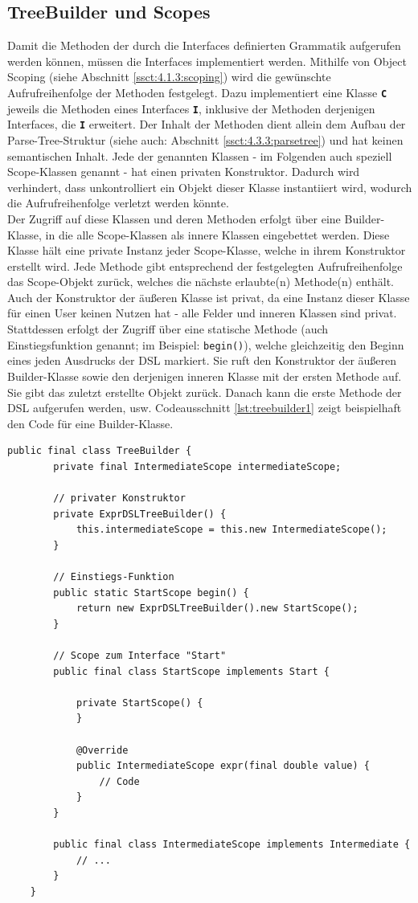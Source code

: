 \subsection{TreeBuilder und Scopes}\label{ssct:4.3.2:treebuilder}
Damit die Methoden der durch die Interfaces definierten Grammatik aufgerufen werden können, müssen die Interfaces implementiert werden. Mithilfe von Object Scoping (siehe Abschnitt \ref{ssct:4.1.3:scoping}) wird die gewünschte Aufrufreihenfolge der Methoden festgelegt. Dazu implementiert eine Klasse \textbf{\texttt{C}} jeweils die Methoden eines Interfaces \textbf{\texttt{I}}, inklusive der Methoden derjenigen Interfaces, die \textbf{\texttt{I}} erweitert. Der Inhalt der Methoden dient allein dem Aufbau der Parse-Tree-Struktur (siehe auch: Abschnitt \ref{ssct:4.3.3:parsetree}) und hat keinen semantischen Inhalt. Jede der genannten Klassen - im Folgenden auch speziell Scope-Klassen genannt - hat einen privaten Konstruktor. Dadurch wird verhindert, dass unkontrolliert ein Objekt dieser Klasse instantiiert wird, wodurch die Aufrufreihenfolge verletzt werden könnte.\\
Der Zugriff auf diese Klassen und deren Methoden erfolgt über eine Builder-Klasse, in die alle Scope-Klassen als innere Klassen eingebettet werden. Diese Klasse hält eine private Instanz jeder Scope-Klasse, welche in ihrem Konstruktor erstellt wird. Jede Methode gibt entsprechend der festgelegten Aufrufreihenfolge das Scope-Objekt zurück, welches die nächste erlaubte(n) Methode(n) enthält. Auch der Konstruktor der äußeren Klasse ist privat, da eine Instanz dieser Klasse für einen User keinen Nutzen hat - alle Felder und inneren Klassen sind privat. Stattdessen erfolgt der Zugriff über eine statische Methode (auch Einstiegsfunktion genannt; im Beispiel: \texttt{begin()}), welche gleichzeitig den Beginn eines jeden Ausdrucks der DSL markiert. Sie ruft den Konstruktor der äußeren Builder-Klasse sowie den derjenigen inneren Klasse mit der ersten Methode auf. Sie gibt das zuletzt erstellte Objekt zurück. Danach kann die erste Methode der DSL aufgerufen werden, usw. Codeausschnitt \ref{lst:treebuilder1} zeigt beispielhaft den Code für eine Builder-Klasse.

\begin{lstlisting}[caption={Code für eine Builder-Klasse mit inneren Scope-Klassen},label=lst:treebuilder1]
	public final class TreeBuilder {
		private final IntermediateScope intermediateScope;
		
		// privater Konstruktor
		private ExprDSLTreeBuilder() {
			this.intermediateScope = this.new IntermediateScope();
		}
		
		// Einstiegs-Funktion
		public static StartScope begin() {
			return new ExprDSLTreeBuilder().new StartScope();
		}
		
		// Scope zum Interface "Start"
		public final class StartScope implements Start {
	
			private StartScope() {
			}
	
			@Override
			public IntermediateScope expr(final double value) {
				// Code	
			}
		}
		
		public final class IntermediateScope implements Intermediate {
			// ...
		}
	}
\end{lstlisting}

